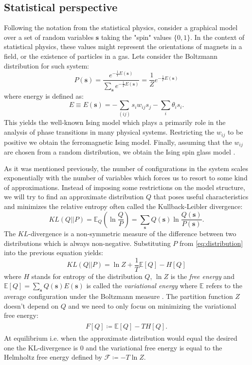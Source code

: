 \documentclass[../report/report.tex]{subfiles}
\begin{document}
\subsection{Statistical perspective}
Following the notation from the statistical physics, consider a graphical model over a set of random variables $\mathbf{s}$ taking the "spin" values $\{0, 1 \}$. In the context of statistical physics, these values might represent the orientations of magnets in a field, or the existence of particles in a gas. Lets consider the Boltzmann distribution for such system:
\begin{equation}
P(\mathbf{s}) = \frac{ e^{-\frac{1}{T}E(\mathbf{s})}}{\sum_{\mathbf{s}} e^{-\frac{1}{T}E(\mathbf{s})}} = \frac{1}{Z}e^{-\frac{1}{T}E(\mathbf{s})}
\label{eq:distribution}
\end{equation}
where energy is defined as:
$$E \equiv E (\mathbf{s}) = - \sum_{(ij)} s_i w_{ij} s_j - \sum_i \theta_i s_i.$$
This yields the well-known Ising model which plays a primarily role in the analysis of phase transitions in many physical systems. Restricting the $w_{ij}$ to be positive we obtain the ferromagnetic Ising model. Finally, assuming that the $w_{ij}$ are chosen from a random distribution, we obtain the Ising spin glass model \cite{yedidia2001idiosyncratic}. 

As it was mentioned previously, the number of configurations in the system scales exponentially with the number of variables which forces us to resort to some kind of approximations. Instead of imposing some restrictions on the model structure, we will try to find an approximate distribution $Q$ that poses useful characteristics and minimizes the relative entropy often called the Kullback-Leibler divergence:
\begin{equation}
KL(Q || P)  = \mathbb{E}_{Q}\left( \ln \frac{Q}{P} \right) = \sum_{\mathbf{s}} Q(\mathbf{s}) \ln \frac{Q(\mathbf{s})}{P(\mathbf{s})} .
\label{eq:kl}
\end{equation}
The $KL$-divergence is a non-symmetric measure of the difference between two distributions which is always non-negative. Substituting $P$ from \ref{eq:distribution} into the previous equation yields:
$$ KL(Q||P) = \ln Z + \frac{1}{T}\mathbb{E}[Q] - H[Q]$$
where $H$ stands for entropy of the distribution $Q$, $\ln Z$ is the \emph{free energy} and $\mathbb{E}[Q] = \sum_{\mathbf{s}} Q(\mathbf{s})E(\mathbf{s})$ is called the \emph{variational energy} where $\mathbb{E}$ refers to the average configuration under the Boltzmann measure \cite{opper2001advanced}. The partition function $Z$ doesn't depend on $Q$ and we need to only focus on minimizing the variational free energy:
\begin{align}
\begin{split}
F[Q]  \coloneqq \mathbb{E}[Q] - TH[Q].
\label{eq:gibbsFreeEnergy}
\end{split}
\end{align}
At equilibrium i.e. when the approximate distribution would equal the desired one the KL-divergence is $0$ and the variational free energy is equal to the Helmholtz free energy defined by 
$\mathcal{F} \coloneqq -T \ln Z$. 
\end{document}
